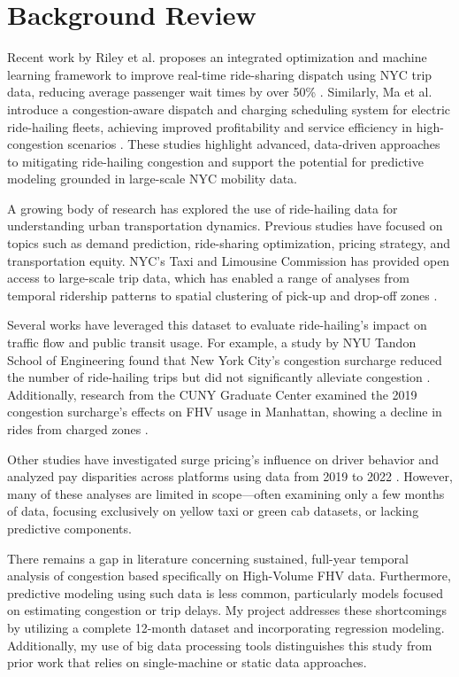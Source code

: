 \documentclass{article}
\begin{document}
\section{Background Review}
Recent work by Riley et al. proposes an integrated optimization and machine learning framework to improve real-time ride-sharing dispatch using NYC trip data, reducing average passenger wait times by over 50\% \cite{riley2020dispatching}. Similarly, Ma et al. introduce a congestion-aware dispatch and charging scheduling system for electric ride-hailing fleets, achieving improved profitability and service efficiency in high-congestion scenarios \cite{ma2024congestionaware}. These studies highlight advanced, data-driven approaches to mitigating ride-hailing congestion and support the potential for predictive modeling grounded in large-scale NYC mobility data.

A growing body of research has explored the use of ride-hailing data for understanding urban transportation dynamics. Previous studies have focused on topics such as demand prediction, ride-sharing optimization, pricing strategy, and transportation equity. NYC’s Taxi and Limousine Commission has provided open access to large-scale trip data, which has enabled a range of analyses from temporal ridership patterns to spatial clustering of pick-up and drop-off zones \cite{nyctlc2023}.

Several works have leveraged this dataset to evaluate ride-hailing’s impact on traffic flow and public transit usage. For example, a study by NYU Tandon School of Engineering found that New York City’s congestion surcharge reduced the number of ride-hailing trips but did not significantly alleviate congestion \cite{nyu2023}. Additionally, research from the CUNY Graduate Center examined the 2019 congestion surcharge’s effects on FHV usage in Manhattan, showing a decline in rides from charged zones \cite{cuny2023}.

Other studies have investigated surge pricing’s influence on driver behavior \cite{surgepricing2022} and analyzed pay disparities across platforms using data from 2019 to 2022 \cite{ucla2023}. However, many of these analyses are limited in scope—often examining only a few months of data, focusing exclusively on yellow taxi or green cab datasets, or lacking predictive components.

There remains a gap in literature concerning sustained, full-year temporal analysis of congestion based specifically on High-Volume FHV data. Furthermore, predictive modeling using such data is less common, particularly models focused on estimating congestion or trip delays. My project addresses these shortcomings by utilizing a complete 12-month dataset and incorporating regression modeling. Additionally, my use of big data processing tools distinguishes this study from prior work that relies on single-machine or static data approaches.
\end{document}

